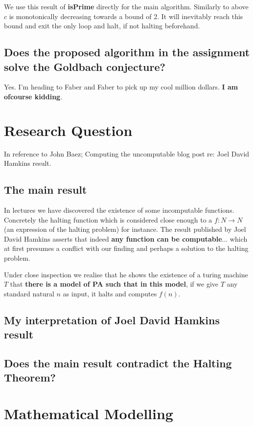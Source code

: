\documentclass{article}
\begin{document}
We use this result of \textbf{isPrime} directly for the main algorithm. Similarly to above $c$ is monotonically decreasing towards a bound of 2. It will inevitably reach this bound and exit the only loop and halt, if not halting beforehand.

\subsection{Does the proposed algorithm in the assignment solve the Goldbach conjecture?}
Yes. I'm heading to Faber and Faber to pick up my cool million dollars. \textbf{I am ofcourse kidding}.

\pagebreak
\section{Research Question}
In reference to John Baez; Computing the uncomputable blog post re: Joel David Hamkins result.

\subsection{The main result}
In lectures we have discovered the existence of some incomputable functions. Concretely the halting function which is considered close enough to a $f: N \rightarrow N$ (an expression of the halting problem) for instance. The result published by Joel David Hamkins asserts that indeed \textbf{any function can be computable}... which at first presumes a conflict with our finding and perhaps a solution to the halting problem.

Under close inspection we realise that he shows the existence of a turing machine $T$ that \textbf{there is a model of PA such that in this model}, if we give $T$ any standard natural $n$ as input, it halts and computes $f(n)$.

\subsection{My interpretation of Joel David Hamkins result}
\subsection{Does the main result contradict the Halting Theorem?}


\section{Mathematical Modelling}
\end{document}
